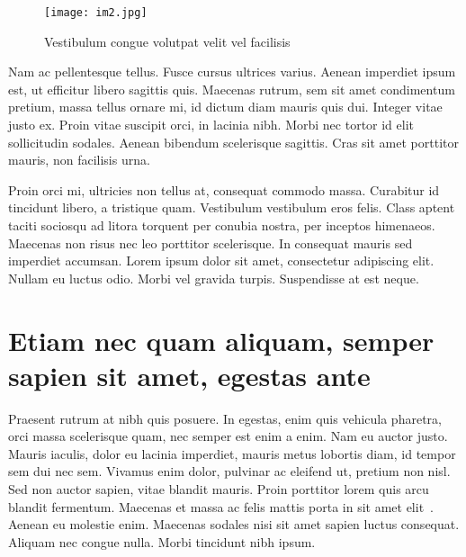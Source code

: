 \begin{figure}[H]
	\begin{center}
		\texttt{[image: im2.jpg]}
		\caption{Vestibulum congue volutpat velit vel facilisis}
		\label{fig:my_label2}
	\end{center}
\end{figure}

Nam ac pellentesque tellus. Fusce cursus ultrices varius. Aenean imperdiet ipsum est, ut efficitur libero sagittis quis. Maecenas rutrum, sem sit amet condimentum pretium, massa tellus ornare mi, id dictum diam mauris quis dui. Integer vitae justo ex. Proin vitae suscipit orci, in lacinia nibh. Morbi nec tortor id elit sollicitudin sodales. Aenean bibendum scelerisque sagittis. Cras sit amet porttitor mauris, non facilisis urna.

Proin orci mi, ultricies non tellus at, consequat commodo massa. Curabitur id tincidunt libero, a tristique quam. Vestibulum vestibulum eros felis. Class aptent taciti sociosqu ad litora torquent per conubia nostra, per inceptos himenaeos. Maecenas non risus nec leo porttitor scelerisque. In consequat mauris sed imperdiet accumsan. Lorem ipsum dolor sit amet, consectetur adipiscing elit. Nullam eu luctus odio. Morbi vel gravida turpis. Suspendisse at est neque.
\section{Etiam nec quam aliquam, semper sapien sit amet, egestas ante}
Praesent rutrum at nibh quis posuere. In egestas, enim quis vehicula pharetra, orci massa scelerisque quam, nec semper est enim a enim. Nam eu auctor justo. Mauris iaculis, dolor eu lacinia imperdiet, mauris metus lobortis diam, id tempor sem dui nec sem. Vivamus enim dolor, pulvinar ac eleifend ut, pretium non nisl. Sed non auctor sapien, vitae blandit mauris. Proin porttitor lorem quis arcu blandit fermentum. Maecenas et massa ac felis mattis porta in sit amet elit~\cite{PhD_Starodubtsev,ivankov2014}. Aenean eu molestie enim. Maecenas sodales nisi sit amet sapien luctus consequat. Aliquam nec congue nulla. Morbi tincidunt nibh ipsum.
